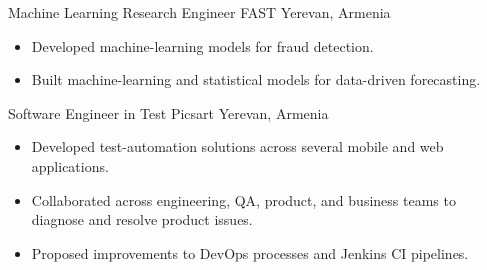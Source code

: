 \documentclass[10pt,a4paper,sans]{moderncv}        %
\newcommand{\picsart}{Picsart}
\newcommand{\yerevan}{Yerevan, Armenia}
\begin{document}
{Machine Learning Research Engineer}
{FAST}
{\yerevan}
{}
{
  \begin{itemize}
  \item Developed machine-learning models for fraud detection.
  \item Built machine-learning and statistical models for data-driven forecasting.
  \end{itemize}
} %

{Software Engineer in Test}
{\picsart}
{\yerevan}
{}
{
  \begin{itemize}
  \item Developed test-automation solutions across several mobile and web applications.
  \item Collaborated across engineering, QA, product, and business teams to diagnose and resolve product issues.
  \item Proposed improvements to DevOps processes and Jenkins CI pipelines.
  \end{itemize}
} %
\end{document}
